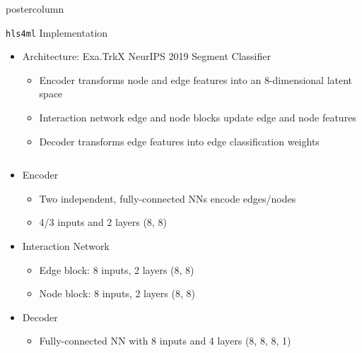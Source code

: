 \documentclass[final,hyperref={pdfpagelabels=false}]{beamer}
\newcommand{\hlsfml}{{\texttt{hls4ml}}\xspace}
\begin{document}
\begin{frame}
\begin{columns}
\begin{column}{.49\textwidth}
\begin{beamercolorbox}[center,wd=\textwidth]{postercolumn}
\begin{minipage}[T]{.95\textwidth}
{              \begin{block}{{\hlsfml} Implementation}
              \begin{itemize}
                \item Architecture: Exa.TrkX NeurIPS 2019 Segment Classifier
                \begin{itemize}
                  \item Encoder transforms node and edge features into an 8-dimensional latent space
                  \item Interaction network edge and node blocks update edge and node features
                  \item Decoder transforms edge features into edge classification weights
                \end{itemize}
              \end{itemize}
              \begin{columns}              
              \begin{column}{.49\textwidth}
                \begin{itemize}
                  \item Encoder
                  \begin{itemize}
                    \item Two independent, fully-connected NNs encode edges/nodes
                    \item 4/3 inputs and 2 layers (8, 8)
                  \end{itemize}
                  \item Interaction Network
                  \begin{itemize}
                    \item Edge block: 8 inputs, 2 layers (8, 8)
                    \item Node block: 8 inputs, 2 layers (8, 8)
                  \end{itemize}
                  \item Decoder
                  \begin{itemize}
                      \item Fully-connected NN with 8 inputs and 4 layers (8, 8, 8, 1)
                  \end{itemize}
                \end{itemize}
              \end{column}
              \begin{column}{.49\textwidth}
                \begin{center}

\end{center}
\end{column}
\end{columns}
\end{block}}
\end{minipage}
\end{beamercolorbox}
\end{column}
\end{columns}
\end{frame}
\end{document}
